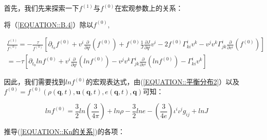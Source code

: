 \documentclass[LBMDerivation.tex]{subfiles}
\begin{document}




首先，我们先来探索一下$f^{(1)}$与$f^{(0)}$在宏观参数上的关系：

将（\ref{EQUATION::B.4}）除以$f^{(0)}$,


\begin{equation}
  \begin{gathered}
    \frac{f^{(1)}}{f^{(0)}}=-\frac{\tau}{f^{(0)}}\left[\partial_{t_{0}} f^{(0)}+v^{i}\frac{\partial}{\partial q^{i}}\left( f^{(0)}\right)+  f^{(0)}\frac{1}{J} \frac{\partial J}{\partial q^i}v^i - 2  f^{(0)}\Gamma_{ki}^iv^k  -v^{j} v^{k} \Gamma_{j k}^{i} \frac{\partial}{\partial v^{i}}\left(  f^{(0)}\right) \right] \\
    = -\tau \left[\partial_{t_{0}} ln f^{(0)}+v^{i}\frac{\partial}{\partial q^{i}}\left( ln f^{(0)}\right) -v^{j} v^{k} \Gamma_{j k}^{i} \frac{\partial}{\partial v^{i}}\left(  ln f^{(0)}\right) -  \Gamma_{ki}^i v^k  \right]
  \end{gathered}
  \label{EQUATION::Kn的关系} ~
\end{equation}


因此，我们需要找到$ln f^{(0)}$的宏观表达式，由(\ref{EQUATION::平衡分布2}）以及$f^{(0)}=f^{(0)}(\rho(\boldsymbol{q},t),\boldsymbol{u}(\boldsymbol{q},t),e(\boldsymbol{q},t),\boldsymbol{q})$可知：


\begin{equation}
  ln f^{(0)} = \frac{3}{2} ln(\frac{3}{4\pi}) + ln \rho - \frac{3}{2} ln e - (\frac{3}{4e}){\iota^i\iota^jg_{ij}}+  ln J
\end{equation}


推导(\ref{EQUATION::Kn的关系})的各项：
\end{document}
